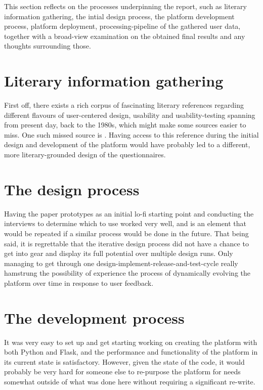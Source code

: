 This section reflects on the processes underpinning the report, such as
literary information gathering, the intial design process, the platform
development process, platform deployment, processing-pipeline of the gathered
user data,  together with a broad-view examination on the obtained final
results and any thoughts surrounding those.

\section{Literary information gathering}

  First off, there exists a rich corpus of fascinating literary references
  regarding different flavours of user-centered design, usability and
  usability-testing spanning from present day, back to the 1980s, which might
  make some sources easier to miss. One such missed source is
  \cite{citeBeyondTheUsabilityLab}. Having access to this reference during the
  initial design and development of the platform would have probably led to a
  different, more literary-grounded design of the questionnaires.


\section{The design process}

  Having the paper prototypes as an initial lo-fi starting point and conducting
  the interviews to determine which to use worked very well, and is an element
  that would be repeated if a similar process would be done in the future.
  That being said, it is regrettable that the iterative design process did not
  have a chance to get into gear and display its full potential over multiple
  design runs. Only managing to get through one
  design-implement-release-and-test-cycle really hamstrung the possibility of
  experience the process of dynamically evolving the platform over time in
  response to user feedback.

\section{The development process}

  It was very easy to set up and get starting working on creating the platform
  with both Python and Flask, and the performance and functionality of the
  platform in its current state is satisfactory. However, given the state of
  the code, it would probably be very hard for someone else to re-purpose the
  platform for needs somewhat outside of what was done here without requiring
  a significant re-write.

